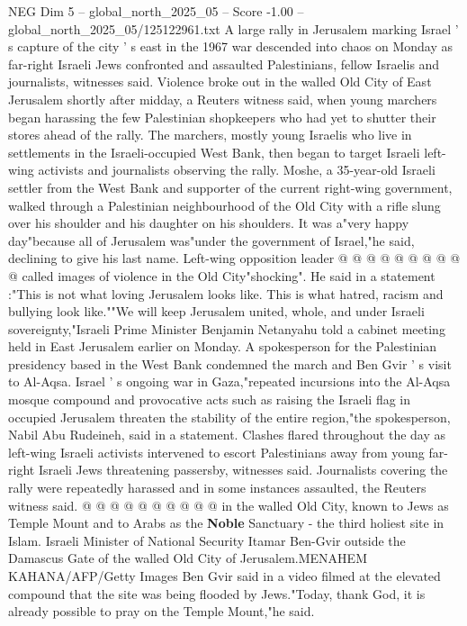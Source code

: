 \begin{textsample}{NEG Dim 5 – global\_north\_2025\_05 – Score -1.00 – global\_north\_2025\_05/125122961.txt}  \label{ex:f5_neg_322}
A large rally in Jerusalem marking Israel ' s capture of the city ' s east in the 1967 war descended into chaos on Monday as far-right Israeli Jews confronted and assaulted Palestinians, fellow Israelis and journalists, witnesses said.
Violence broke out in the walled Old City of East Jerusalem shortly after midday, a Reuters witness said, when young marchers began harassing the few Palestinian shopkeepers who had yet to shutter their stores ahead of the rally.
The marchers, mostly young Israelis who live in settlements in the Israeli-occupied West Bank, then began to target Israeli left-wing activists and journalists observing the rally.
Moshe, a 35-year-old Israeli settler from the West Bank and supporter of the current right-wing government, walked through a Palestinian neighbourhood of the Old City with a rifle slung over his shoulder and his daughter on his shoulders.
It was a"very happy day"because all of Jerusalem was"under the government of Israel,"he said, declining to give his last name.
Left-wing opposition leader @ @ @ @ @ @ @ @ @ @ called images of violence in the Old City"shocking".
He said in a statement :"This is not what loving Jerusalem looks like.
This is what hatred, racism and bullying look like.""We will keep Jerusalem united, whole, and under Israeli sovereignty,"Israeli Prime Minister Benjamin Netanyahu told a cabinet meeting held in East Jerusalem earlier on Monday.
A spokesperson for the Palestinian presidency based in the West Bank condemned the march and Ben Gvir ' s visit to Al-Aqsa.
Israel ' s ongoing war in Gaza,"repeated incursions into the Al-Aqsa mosque compound and provocative acts such as raising the Israeli flag in occupied Jerusalem threaten the stability of the entire region,"the spokesperson, Nabil Abu Rudeineh, said in a statement.
Clashes flared throughout the day as left-wing Israeli activists intervened to escort Palestinians away from young far-right Israeli Jews threatening passersby, witnesses said.
Journalists covering the rally were repeatedly harassed and in some instances assaulted, the Reuters witness said. @ @ @ @ @ @ @ @ @ @ in the walled Old City, known to Jews as Temple Mount and to Arabs as the \textbf{Noble} Sanctuary - the third holiest site in Islam.
Israeli Minister of National Security Itamar Ben-Gvir outside the Damascus Gate of the walled Old City of Jerusalem.MENAHEM KAHANA/AFP/Getty Images Ben Gvir said in a video filmed at the elevated compound that the site was being flooded by Jews."Today, thank God, it is already possible to pray on the Temple Mount,"he said.

\end{textsample}
